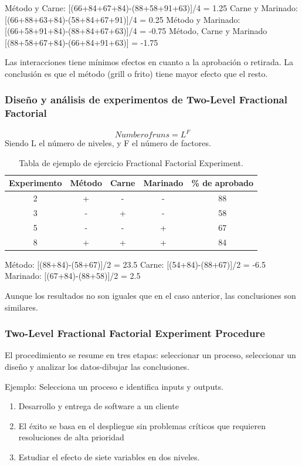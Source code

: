 \documentclass[]{article}
\begin{document}
Método y Carne: [(66+84+67+84)-(88+58+91+63)]/4 = 1.25
Carne y Marinado: [(66+88+63+84)-(58+84+67+91)]/4 = 0.25
Método y Marinado: [(66+58+91+84)-(88+84+67+63)]/4 = -0.75
Método, Carne y Marinado [(88+58+67+84)-(66+84+91+63)] = -1.75

Las interacciones tiene mínimos efectos en cuanto a la aprobación o retirada. La conclusión es que el método (grill o frito) tiene mayor efecto que el resto.

\subsubsection{Diseño y análisis de experimentos de Two-Level Fractional Factorial}
\begin{equation}
Number of runs = L^F
\end{equation}
Siendo L el número de niveles, y F el número de factores.

\begin{table}[H]
	\begin{center}
		\begin{tabular}{|c|c|c|c|c|}
			\hline Experimento & Método & Carne & Marinado & \% de aprobado \\ 
			\hline 2 & + & - & - & 88 \\ 
			\hline 3 & - & + & - & 58 \\ 
			\hline 5 & - & - & + & 67 \\ 
			\hline 8 & + & + & + & 84 \\ 
			\hline 
		\end{tabular} 
		\caption{Tabla de ejemplo de ejercicio Fractional Factorial Experiment.}
	\end{center}
\end{table}

Método: [(88+84)-(58+67)]/2 = 23.5
Carne: [(54+84)-(88+67)]/2 = -6.5
Marinado: [(67+84)-(88+58)]/2 = 2.5

Aunque los resultados no son iguales que en el caso anterior, las conclusiones son similares.

\subsubsection{Two-Level Fractional Factorial Experiment Procedure}

El procedimiento se resume en tres etapas: seleccionar un proceso, seleccionar un diseño y analizar los datos-dibujar las conclusiones.

Ejemplo:
Selecciona un proceso e identifica inputs y outputs.
\begin{enumerate}
	\item Desarrollo y entrega de software a un cliente
	\item El éxito se basa en el despliegue sin problemas críticos que requieren resoluciones de alta prioridad
	\item Estudiar el efecto de siete variables en dos niveles.
\end{enumerate}
\end{document}
